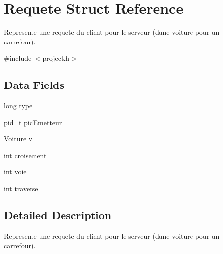 \hypertarget{struct_requete}{}\section{Requete Struct Reference}
\label{struct_requete}


Represente une requete du client pour le serveur (d\textquotesingle{}une voiture pour un carrefour).  




{\ttfamily \#include $<$project.\+h$>$}

\subsection*{Data Fields}
\begin{DoxyCompactItemize}
\item 
long \hyperlink{struct_requete_a6a83a8677f7c78fd146859325e08209a}{type}
\item 
pid\+\_\+t \hyperlink{struct_requete_a3041e2766c91f9b17975056266bfc841}{pid\+Emetteur}
\item 
\hyperlink{struct_voiture}{Voiture} \hyperlink{struct_requete_a76a64000aab59dcc4195c1b6e1605eb3}{v}
\item 
int \hyperlink{struct_requete_a558796b11448541e07f81ec0df5bf2bc}{croisement}
\item 
int \hyperlink{struct_requete_ad5ecb866a563750cd63db63b9b56c060}{voie}
\item 
int \hyperlink{struct_requete_a276684defbdd9a2e8b95ce40b8ef3576}{traverse}
\end{DoxyCompactItemize}


\subsection{Detailed Description}
Represente une requete du client pour le serveur (d\textquotesingle{}une voiture pour un carrefour). 


